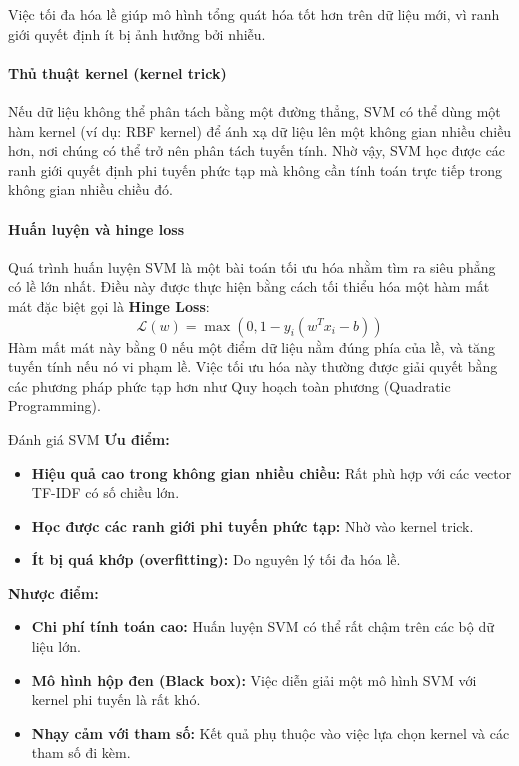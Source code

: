 Việc tối đa hóa lề giúp mô hình tổng quát hóa tốt hơn trên dữ liệu mới, vì ranh giới quyết định ít bị ảnh hưởng bởi nhiễu.

\paragraph{Thủ thuật kernel (kernel trick)}
Nếu dữ liệu không thể phân tách bằng một đường thẳng, SVM có thể dùng một hàm kernel (ví dụ: RBF kernel) để ánh xạ dữ liệu lên một không gian nhiều chiều hơn, nơi chúng có thể trở nên phân tách tuyến tính. Nhờ vậy, SVM học được các ranh giới quyết định phi tuyến phức tạp mà không cần tính toán trực tiếp trong không gian nhiều chiều đó.

\paragraph{Huấn luyện và hinge loss}
Quá trình huấn luyện SVM là một bài toán tối ưu hóa nhằm tìm ra siêu phẳng có lề lớn nhất. Điều này được thực hiện bằng cách tối thiểu hóa một hàm mất mát đặc biệt gọi là \textbf{Hinge Loss}:
$$ \mathcal{L}(w) = \max(0, 1 - y_i(w^T x_i - b)) $$
Hàm mất mát này bằng 0 nếu một điểm dữ liệu nằm đúng phía của lề, và tăng tuyến tính nếu nó vi phạm lề. Việc tối ưu hóa này thường được giải quyết bằng các phương pháp phức tạp hơn như Quy hoạch toàn phương (Quadratic Programming).

\begin{assess}{Đánh giá SVM}
\textbf{Ưu điểm:}
\begin{itemize}
    \item \textbf{Hiệu quả cao trong không gian nhiều chiều:} Rất phù hợp với các vector TF-IDF có số chiều lớn.
    \item \textbf{Học được các ranh giới phi tuyến phức tạp:} Nhờ vào kernel trick.
    \item \textbf{Ít bị quá khớp (overfitting):} Do nguyên lý tối đa hóa lề.
\end{itemize}
\textbf{Nhược điểm:}
\begin{itemize}
    \item \textbf{Chi phí tính toán cao:} Huấn luyện SVM có thể rất chậm trên các bộ dữ liệu lớn.
    \item \textbf{Mô hình hộp đen (Black box):} Việc diễn giải một mô hình SVM với kernel phi tuyến là rất khó.
    \item \textbf{Nhạy cảm với tham số:} Kết quả phụ thuộc vào việc lựa chọn kernel và các tham số đi kèm.
\end{itemize}
\end{assess}


